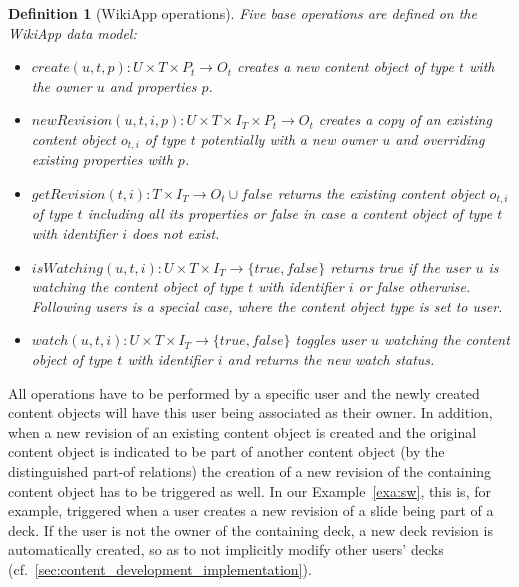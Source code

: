 \documentclass[PhD, Submit, ngerman,UKenglish,table]{scrbook}
\newtheorem{definition}{Definition}
\begin{document}
\begin{definition}[WikiApp operations]
\label{def:operations}
Five base operations are defined on the WikiApp data model:
\begin{itemize}
	\item $create(u,t,p):U \times T \times P_t \rightarrow O_t$ creates a new content object of type $t$ with the owner $u$ and properties $p$.
	\item $newRevision(u,t,i,p):U \times T \times I_T \times P_t \rightarrow O_t$ creates a copy of an existing content object $o_{t,i}$ of type $t$ potentially with a new owner $u$ and overriding existing properties with $p$.
	\item $getRevision(t,i):T \times I_T \rightarrow O_t \cup {false}$ returns the existing content object $o_{t,i}$ of type $t$ including all its properties or false in case a content object of type $t$ with identifier $i$ does not exist.
	\item $isWatching(u,t,i):U \times T \times I_T \rightarrow \{true,false\}$ returns true if the user $u$ is watching the content object of type $t$ with identifier $i$ or false otherwise.
	Following users is a special case, where the content object type is set to user.
	\item $watch(u,t,i):U \times T \times I_T \rightarrow \{true,false\}$ toggles user $u$ watching the content object of type $t$ with identifier $i$ and returns the new watch status.
\end{itemize}
\end{definition}

All operations have to be performed by a specific user and the newly created content objects will have this user being associated as their owner.
In addition, when a new revision of an existing content object is created and the original content object is indicated to be part of another content object (by the distinguished part-of relations) the creation of a new revision of the containing content object has to be triggered as well.
In our Example~\autoref{exa:sw}, this is, for example, triggered when a user creates a new revision of a slide being part of a deck.
If the user is not the owner of the containing deck, a new deck revision is automatically created, so as to not implicitly modify other users' decks (cf.~\autoref{sec:content_development_implementation}).

%
\end{document}
